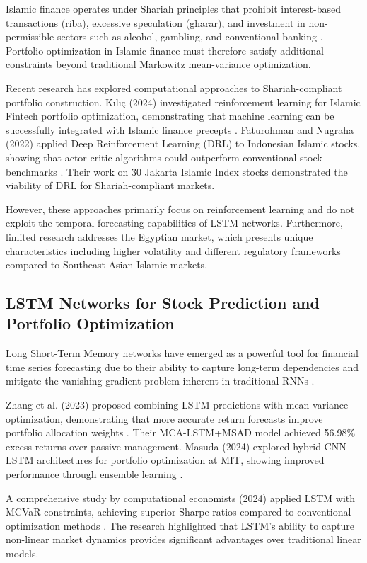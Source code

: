 \documentclass[conference]{IEEEtran}
\begin{document}
Islamic finance operates under Shariah principles that prohibit interest-based transactions (riba), excessive speculation (gharar), and investment in non-permissible sectors such as alcohol, gambling, and conventional banking \cite{shariah_principles}. Portfolio optimization in Islamic finance must therefore satisfy additional constraints beyond traditional Markowitz mean-variance optimization.

Recent research has explored computational approaches to Shariah-compliant portfolio construction. Kılıç (2024) investigated reinforcement learning for Islamic Fintech portfolio optimization, demonstrating that machine learning can be successfully integrated with Islamic finance precepts \cite{islamic_ml_2024}. Faturohman and Nugraha (2022) applied Deep Reinforcement Learning (DRL) to Indonesian Islamic stocks, showing that actor-critic algorithms could outperform conventional stock benchmarks \cite{islamic_drl_2022}. Their work on 30 Jakarta Islamic Index stocks demonstrated the viability of DRL for Shariah-compliant markets.

However, these approaches primarily focus on reinforcement learning and do not exploit the temporal forecasting capabilities of LSTM networks. Furthermore, limited research addresses the Egyptian market, which presents unique characteristics including higher volatility and different regulatory frameworks compared to Southeast Asian Islamic markets.

\subsection{LSTM Networks for Stock Prediction and Portfolio Optimization}

Long Short-Term Memory networks have emerged as a powerful tool for financial time series forecasting due to their ability to capture long-term dependencies and mitigate the vanishing gradient problem inherent in traditional RNNs \cite{hochreiter1997lstm}.

Zhang et al. (2023) proposed combining LSTM predictions with mean-variance optimization, demonstrating that more accurate return forecasts improve portfolio allocation weights \cite{lstm_mvo_2023}. Their MCA-LSTM+MSAD model achieved 56.98\% excess returns over passive management. Masuda (2024) explored hybrid CNN-LSTM architectures for portfolio optimization at MIT, showing improved performance through ensemble learning \cite{mit_lstm_2024}.

A comprehensive study by computational economists (2024) applied LSTM with MCVaR constraints, achieving superior Sharpe ratios compared to conventional optimization methods \cite{lstm_mcvar_2024}. The research highlighted that LSTM's ability to capture non-linear market dynamics provides significant advantages over traditional linear models.
\end{document}
